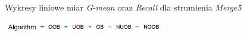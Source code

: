 \begin{figure}[h]
    \centering
    \qquad
    \caption{Wykresy liniowe miar \textit{G-mean} oraz \textit{Recall} dla strumienia \textit{Merge5}}\label{Figure:Join5}
\end{figure}

\begin{figure}[h]
    \centering
    \includegraphics[width=7cm]{figures/algorithms_legend.JPG}
\end{figure}

\vspace{-1.2cm}

